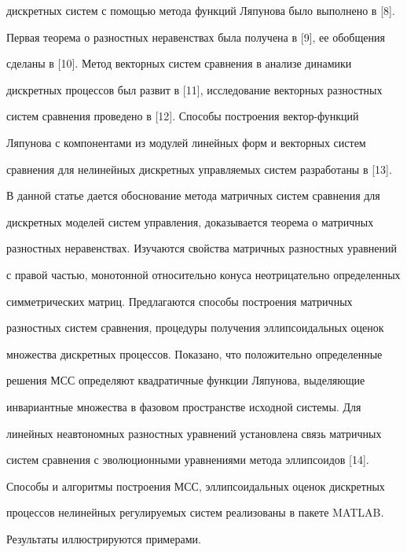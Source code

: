 дискретных систем с помощью метода функций Ляпунова было выполнено в [8].


Первая теорема о разностных неравенствах была получена в [9], ее обобщения


сделаны в [10]. Метод векторных систем сравнения в анализе динамики


дискретных процессов был развит в [11], исследование векторных разностных


систем сравнения проведено в [12]. Способы построения вектор-функций


Ляпунова с компонентами из модулей линейных форм и векторных систем


сравнения для нелинейных дискретных управляемых систем разработаны в [13].





В данной статье дается обоснование метода матричных систем сравнения для


дискретных моделей систем управления, доказывается теорема о матричных


разностных неравенствах. Изу\-ча\-ют\-ся свойства матричных разностных уравнений


с правой частью, монотонной относительно конуса неотрицательно определенных


симметрических матриц. Предлагаются способы построения матричных


разностных систем сравнения, процедуры получения эллипсоидальных оценок


множества дискретных процессов. Показано, что положительно определенные


решения МСС определяют квадратичные функции Ляпунова, выделяющие


инвариантные множества в фазовом пространстве исходной системы. Для


линейных неавтономных разностных уравнений установлена связь матричных


систем сравнения с эволюционными уравнениями метода эллипсоидов [14].





Способы и алгоритмы построения МСС, эллипсоидальных оценок дискретных


процессов нелинейных регулируемых систем реализованы в пакете MATLAB.


Результаты иллюстрируются примерами.








